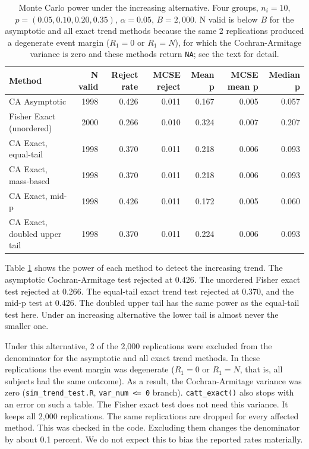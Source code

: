 \documentclass[
  11pt,
]{article}
\begin{document}
\begin{table}[!h]
\centering
\caption{\label{tab:table-alt}Monte Carlo power under the increasing alternative. Four groups, $n_i = 10$, $p = (0.05, 0.10, 0.20, 0.35)$, $\alpha = 0.05$, $B = 2{,}000$. N valid is below $B$ for the asymptotic and all exact trend methods because the same 2 replications produced a degenerate event margin ($R_1 = 0$ or $R_1 = N$), for which the Cochran-Armitage variance is zero and these methods return \texttt{NA}; see the text for detail.}
\centering
\fontsize{9}{11}\selectfont
\begin{tabular}[t]{lrrrrrr}
\toprule
Method & N valid & Reject rate & MCSE reject & Mean p & MCSE mean p & Median p\\
\midrule
CA Asymptotic & 1998 & 0.426 & 0.011 & 0.167 & 0.005 & 0.057\\
Fisher Exact (unordered) & 2000 & 0.266 & 0.010 & 0.324 & 0.007 & 0.207\\
CA Exact, equal-tail & 1998 & 0.370 & 0.011 & 0.218 & 0.006 & 0.093\\
CA Exact, mass-based & 1998 & 0.370 & 0.011 & 0.218 & 0.006 & 0.093\\
CA Exact, mid-p & 1998 & 0.426 & 0.011 & 0.172 & 0.005 & 0.060\\
\addlinespace
CA Exact, doubled upper tail & 1998 & 0.370 & 0.011 & 0.224 & 0.006 & 0.093\\
\bottomrule
\end{tabular}
\end{table}

Table \ref{tab:table-alt} shows the power of each method
to detect the increasing trend. The asymptotic
Cochran-Armitage test rejected at 0.426. The
unordered Fisher exact test rejected at 0.266.
The equal-tail exact trend test rejected at
0.370, and the mid-p test at 0.426.
The doubled upper tail has the same power as the
equal-tail test here. Under an increasing alternative the
lower tail is almost never the smaller one.

Under this alternative, 2 of the 2,000
replications were excluded from the denominator for the
asymptotic and all exact trend methods. In these
replications the event margin was degenerate
(\(R_1 = 0\) or \(R_1 = N\), that is, all subjects had the
same outcome). As a result, the Cochran-Armitage variance
was zero (\texttt{sim\_trend\_test.R}, \texttt{var\_num\ \textless{}=\ 0} branch).
\texttt{catt\_exact()} also stops with an error on such a table.
The Fisher exact test does not need this variance. It
keeps all 2,000 replications. The same replications are
dropped for every affected method. This was checked in
the code. Excluding them changes the denominator by about
0.1 percent. We do not expect this to bias the reported
rates materially.
\end{document}
